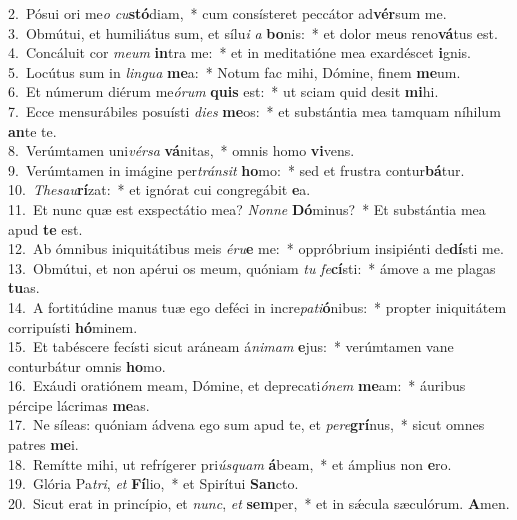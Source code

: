 {2.~}Pósui ori me\textit{o} \textit{cu}\textbf{stó}diam,~* cum consísteret peccátor ad\textbf{vér}sum me.\\
{3.~}Obmútui, et humiliátus sum, et sílu\textit{i} \textit{a} \textbf{bo}nis:~* et dolor meus reno\textbf{vá}tus est.\\
{4.~}Concáluit cor \textit{me}\textit{um} \textbf{in}tra me:~* et in meditatióne mea exardéscet \textbf{i}gnis.\\
{5.~}Locútus sum in \textit{lin}\textit{gua} \textbf{me}a:~* Notum fac mihi, Dómine, finem \textbf{me}um.\\
{6.~}Et númerum diérum me\textit{ó}\textit{rum} \textbf{quis} est:~* ut sciam quid desit \textbf{mi}hi.\\
{7.~}Ecce mensurábiles posuísti \textit{di}\textit{es} \textbf{me}os:~* et substántia mea tamquam níhilum \textbf{an}te te.\\
{8.~}Verúmtamen uni\textit{vér}\textit{sa} \textbf{vá}nitas,~* omnis homo \textbf{vi}vens.\\
{9.~}Verúmtamen in imágine per\textit{trán}\textit{sit} \textbf{ho}mo:~* sed et frustra contur\textbf{bá}tur.\\
{10.~}\textit{The}\textit{sau}\textbf{rí}zat:~* et ignórat cui congregábit \textbf{e}a.\\
{11.~}Et nunc quæ est exspectátio mea? \textit{Non}\textit{ne} \textbf{Dó}minus?~* Et substántia mea apud \textbf{te} est.\\
{12.~}Ab ómnibus iniquitátibus meis \textit{é}\textit{ru}\textbf{e} me:~* oppróbrium insipiénti de\textbf{dí}sti me.\\
{13.~}Obmútui, et non apérui os meum, quóniam \textit{tu} \textit{fe}\textbf{cí}sti:~* ámove a me plagas \textbf{tu}as.\\
{14.~}A fortitúdine manus tuæ ego deféci in incre\textit{pa}\textit{ti}\textbf{ó}nibus:~* propter iniquitátem corripuísti \textbf{hó}minem.\\
{15.~}Et tabéscere fecísti sicut aráneam á\textit{ni}\textit{mam} \textbf{e}jus:~* verúmtamen vane conturbátur omnis \textbf{ho}mo.\\
{16.~}Exáudi oratiónem meam, Dómine, et deprecati\textit{ó}\textit{nem} \textbf{me}am:~* áuribus pércipe lácrimas \textbf{me}as.\\
{17.~}Ne síleas: quóniam ádvena ego sum apud te, et \textit{pe}\textit{re}\textbf{grí}nus,~* sicut omnes patres \textbf{me}i.\\
{18.~}Remítte mihi, ut refrígerer pri\textit{ús}\textit{quam} \textbf{á}beam,~* et ámplius non \textbf{e}ro.\\
{19.~}Glória Pa\textit{tri}, \textit{et} \textbf{Fí}lio,~* et Spirítui \textbf{San}cto.\\
{20.~}Sicut erat in princípio, et \textit{nunc}, \textit{et} \textbf{sem}per,~* et in sǽcula sæculórum. \textbf{A}men.\\
